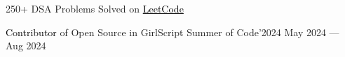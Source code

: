 

250+ DSA Problems Solved on \href{https://leetcode.com/u/mrsamirr/}{\textcolor{black}{LeetCode}} 

{\textcolor{black}{Contributor}} of Open Source in GirlScript Summer of Code'2024 \hfill May 2024 --- Aug 2024


